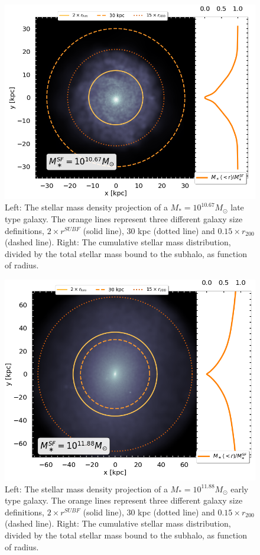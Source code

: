 \begin{figure}
	\centering
    \includegraphics[width=1\textwidth]{images/galaxy_size_disk.png}
    \caption{Left: The stellar mass density projection of a $M_\ast = 10^{10.67} M_\odot$ late type galaxy. The orange lines represent three different galaxy size definitions, $2 \times r^{SUBF}$ (solid line), 30 kpc (dotted line) and $0.15 \times r_{200}$ (dashed line).
    Right: The cumulative stellar mass distribution, divided by the total stellar mass bound to the subhalo, as function of radius.
    }
    \label{gal_size_disk}
\end{figure}

\begin{figure}
    \centering
    \includegraphics[width=1\textwidth]{images/galaxy_size_big.png}
    \caption{Left: The stellar mass density projection of a $M_\ast = 10^{11.88} M_\odot$ early type galaxy. The orange lines represent three different galaxy size definitions, $2 \times r^{SUBF}$ (solid line), 30 kpc (dotted line) and $0.15 \times r_{200}$ (dashed line).
    Right: The cumulative stellar mass distribution, divided by the total stellar mass bound to the subhalo, as function of radius.
    }
    \label{gal_size_big}
\end{figure}


